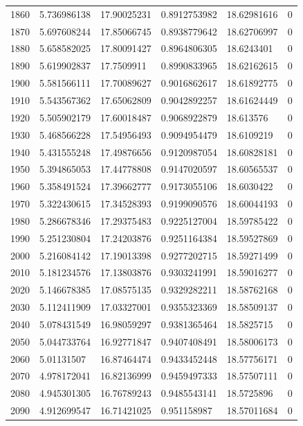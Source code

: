 \begin{longtable}{llllll}
1860 & 5.736986138 & 17.90025231 & 0.8912753982 & 18.62981616 & 0 \\
1870 & 5.697608244 & 17.85066745 & 0.8938779642 & 18.62706997 & 0 \\
1880 & 5.658582025 & 17.80091427 & 0.8964806305 & 18.6243401 & 0 \\
1890 & 5.619902837 & 17.7509911 & 0.8990833965 & 18.62162615 & 0 \\
1900 & 5.581566111 & 17.70089627 & 0.9016862617 & 18.61892775 & 0 \\
1910 & 5.543567362 & 17.65062809 & 0.9042892257 & 18.61624449 & 0 \\
1920 & 5.505902179 & 17.60018487 & 0.9068922879 & 18.613576 & 0 \\
1930 & 5.468566228 & 17.54956493 & 0.9094954479 & 18.6109219 & 0 \\
1940 & 5.431555248 & 17.49876656 & 0.9120987054 & 18.60828181 & 0 \\
1950 & 5.394865053 & 17.44778808 & 0.9147020597 & 18.60565537 & 0 \\
1960 & 5.358491524 & 17.39662777 & 0.9173055106 & 18.6030422 & 0 \\
1970 & 5.322430615 & 17.34528393 & 0.9199090576 & 18.60044193 & 0 \\
1980 & 5.286678346 & 17.29375483 & 0.9225127004 & 18.59785422 & 0 \\
1990 & 5.251230804 & 17.24203876 & 0.9251164384 & 18.59527869 & 0 \\
2000 & 5.216084142 & 17.19013398 & 0.9277202715 & 18.59271499 & 0 \\
2010 & 5.181234576 & 17.13803876 & 0.9303241991 & 18.59016277 & 0 \\
2020 & 5.146678385 & 17.08575135 & 0.9329282211 & 18.58762168 & 0 \\
2030 & 5.112411909 & 17.03327001 & 0.9355323369 & 18.58509137 & 0 \\
2040 & 5.078431549 & 16.98059297 & 0.9381365464 & 18.5825715 & 0 \\
2050 & 5.044733764 & 16.92771847 & 0.9407408491 & 18.58006173 & 0 \\
2060 & 5.01131507 & 16.87464474 & 0.9433452448 & 18.57756171 & 0 \\
2070 & 4.978172041 & 16.82136999 & 0.9459497333 & 18.57507111 & 0 \\
2080 & 4.945301305 & 16.76789243 & 0.9485543141 & 18.5725896 & 0 \\
2090 & 4.912699547 & 16.71421025 & 0.951158987 & 18.57011684 & 0 \\

\end{longtable}
